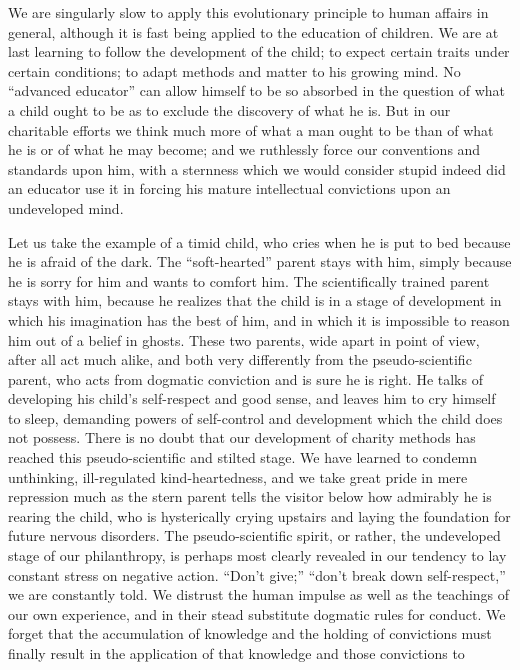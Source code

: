 \documentclass[]{article}
\begin{document}
\begin{sectionbody}
\addamsparagraph We are singularly slow to apply this evolutionary principle to human
affairs in general, although it is fast being applied to the education
of children. We are at last learning to follow the development of the
child; to expect certain traits under certain conditions; to adapt
methods and matter to his growing mind. No ``advanced educator'' can allow
himself to be so absorbed in the question of what a child ought to be
as to exclude the discovery of what he is. But in our charitable efforts
we think much more of what a man ought to be than of what he is or of
what he may become; and we ruthlessly force our conventions and
standards upon him, with a sternness which we would consider stupid
indeed did an educator use it in forcing his mature intellectual
convictions upon an undeveloped mind.

\addamsparagraph Let us take the example of a timid child, who cries when he is put to
bed because he is afraid of the dark. The ``soft-hearted'' parent stays
with him, simply because he is sorry for him and wants to comfort him.
The scientifically trained parent stays with him, because he realizes
that the child is in a stage of development in which his imagination has
the best of him, and in which it is impossible to reason him out of a
belief in ghosts. These two parents, wide apart in point of view, after
all act much alike, and both very differently from the pseudo-scientific
parent, who acts from dogmatic conviction and is sure he is right. He
talks of developing his child's self-respect and good sense, and leaves
him to cry himself to sleep, demanding powers of self-control and
development which the child does not possess. There is no doubt that our
development of charity methods has reached this pseudo-scientific and
stilted stage. We have learned to condemn unthinking, ill-regulated
kind-heartedness, and we take great pride in mere repression much as the
stern parent tells the visitor below how admirably he is rearing the
child, who is hysterically crying upstairs and laying the foundation for
future nervous disorders. The pseudo-scientific spirit, or rather, the
undeveloped stage of our philanthropy, is perhaps most clearly revealed
in our tendency to lay constant stress on negative action. ``Don't give;''
``don't break down self-respect,'' we are constantly told. We distrust the
human impulse as well as the teachings of our own experience, and in
their stead substitute dogmatic rules for conduct. We forget that the
accumulation of knowledge and the holding of convictions must finally
result in the application of that knowledge and those convictions to

\end{sectionbody}
\end{document}

